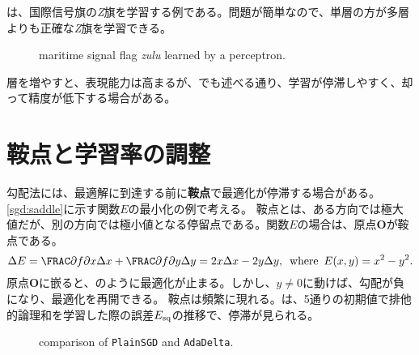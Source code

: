 \documentclass[10pt,a4paper]{book}
\begin{document}
は、国際信号旗の\textit{Z}旗を学習する例である。問題が簡単なので、単層の方が多層よりも正確な\textit{Z}旗を学習できる。

\begin{figure}[h]
\centering
{}
\caption{maritime signal flag \textit{zulu} learned by a perceptron.\label{fig:mcp.zflag}}
\end{figure}

層を増やすと、表現能力は高まるが、でも述べる通り、学習が停滞しやすく、却って精度が低下する場合がある。

\section{鞍点と学習率の調整\label{sect:nn.sgd}}

勾配法には、最適解に到達する前に\textbf{鞍点}で最適化が停滞する場合がある。\eqref{sgd:saddle}に示す関数$E$の最小化の例で考える。
鞍点とは、ある方向では極大値だが、別の方向では極小値となる停留点である。関数$E$の場合は、原点$\bm{O}$が鞍点である。
%
\begin{equation}
\label{eq:sgd:saddle}
\Delta E = \pdiff{f}{x} \Delta x + \pdiff{f}{y} \Delta y = 2x \Delta x - 2y \Delta y,
\where
E(x,y) = x^2 - y^2.
\end{equation}
%
原点$\bm{O}$に嵌ると、のように最適化が止まる。しかし、$y\neq0$に動けば、勾配が負になり、最適化を再開できる。
鞍点は頻繁に現れる。は、5通りの初期値で排他的論理和を学習した際の誤差$E_\mathrm{sq}$の推移で、停滞が見られる。

\begin{figure}[h]
\centering
{}
\caption{comparison of \texttt{PlainSGD} and \texttt{AdaDelta}.\label{fig:sgd}}
\end{figure}
\end{document}
